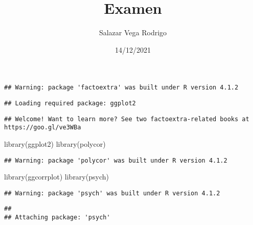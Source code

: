 \documentclass[
]{article}
\title{Examen}
\author{Salazar Vega Rodrigo}
\date{14/12/2021}
\newenvironment{Shaded}{\begin{snugshade}}{\end{snugshade}}
\newcommand{\CommentTok}[1]{\textcolor[rgb]{0.56,0.35,0.01}{\textit{#1}}}
\newcommand{\FunctionTok}[1]{\textcolor[rgb]{0.00,0.00,0.00}{#1}}
\newcommand{\NormalTok}[1]{#1}
\begin{document}
\maketitle

\begin{Shaded}
\end{Shaded}

\begin{verbatim}
## Warning: package 'factoextra' was built under R version 4.1.2
\end{verbatim}

\begin{verbatim}
## Loading required package: ggplot2
\end{verbatim}

\begin{verbatim}
## Welcome! Want to learn more? See two factoextra-related books at https://goo.gl/ve3WBa
\end{verbatim}

\begin{Shaded}
\begin{Highlighting}[]
\FunctionTok{library}\NormalTok{(ggplot2)}
\FunctionTok{library}\NormalTok{(polycor)}
\end{Highlighting}
\end{Shaded}

\begin{verbatim}
## Warning: package 'polycor' was built under R version 4.1.2
\end{verbatim}

\begin{Shaded}
\begin{Highlighting}[]
\FunctionTok{library}\NormalTok{(ggcorrplot)}
\FunctionTok{library}\NormalTok{(psych)}
\end{Highlighting}
\end{Shaded}

\begin{verbatim}
## Warning: package 'psych' was built under R version 4.1.2
\end{verbatim}

\begin{verbatim}
## 
## Attaching package: 'psych'
\end{verbatim}
\end{document}
